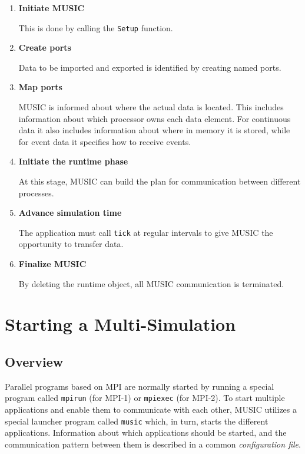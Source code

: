 \documentclass[a4paper,twoside]{report}
\begin{document}
\begin{enumerate}
\item \textbf{Initiate MUSIC}

  This is done by calling the \lstinline!Setup! function.
\item \textbf{Create ports}

  Data to be imported and exported is identified by creating named
  ports.
\item \textbf{Map ports}

  MUSIC is informed about where the actual data is located.  This
  includes information about which processor owns each data element.
  For continuous data it also includes information about where in
  memory it is stored, while for event data it specifies how to
  receive events.
\item \textbf{Initiate the runtime phase}

  At this stage, MUSIC can build the plan for communication between
  different processes.
\item \textbf{Advance simulation time}

  The application must call \lstinline!tick! at regular intervals
  to give MUSIC the opportunity to transfer data.
\item \textbf{Finalize MUSIC}

  By deleting the runtime object, all MUSIC communication is terminated.
\end{enumerate}


\chapter{Starting a Multi-Simulation}

\section{Overview}

Parallel programs based on MPI are normally started by running a
special program called \texttt{mpirun} (for MPI-1) or
\texttt{mpiexec} (for MPI-2).  To start multiple
applications and enable them to communicate with each other, MUSIC
utilizes a special launcher program called \texttt{music} which, in turn, starts the different applications.
Information about which applications should be started, and the
communication pattern between them is described in a common
\emph{configuration file}.
\end{document}
